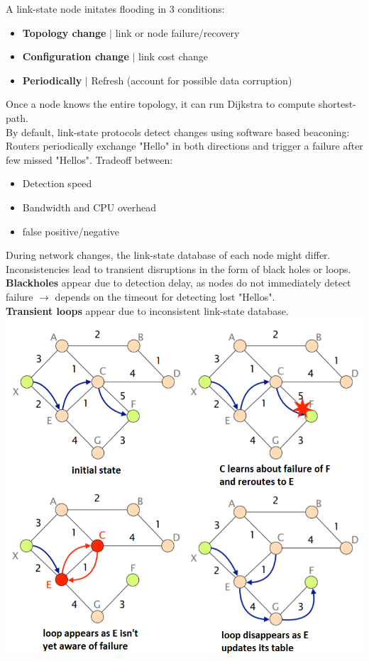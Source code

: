 \documentclass[a4paper, fontsize=8pt, landscape, DIV=1]{scrartcl}
\begin{document}
\begin{multicols*}{4}
\begin{itemize}[noitemsep]
\begin{itemize}
    		\end{itemize}
   	 	\end{itemize}  
   		A link-state node initates flooding in 3 conditions: 
   		\begin{itemize}[noitemsep]
   			\item \textbf{Topology change} $\vert$ link or node failure/recovery
   			\item \textbf{Configuration change} $\vert$ link cost change
   			\item \textbf{Periodically} $\vert$ Refresh (account for possible data corruption)
   		\end{itemize}
   		Once a node knows the entire topology, it can run Dijkstra to compute shortest-path.\\
   		By default, link-state protocols detect changes using software based beaconing:\\
   		Routers periodically exchange "Hello" in both directions and trigger a failure after few missed "Hellos". Tradeoff between: 
   		\begin{itemize}[noitemsep]
   			\item Detection speed
   			\item Bandwidth and CPU overhead
   			\item false positive/negative
   		\end{itemize}  
   		During network changes, the link-state database of each node might differ. Inconsistencies lead to transient disruptions in the form of black holes or loops.\\
   		\textbf{Blackholes} appear due to detection delay, as nodes do not immediately detect failure $\rightarrow$ depends on the timeout for detecting lost "Hellos".\\
   		\textbf{Transient loops} appear due to inconsistent link-state database.
   		\includegraphics[width=\columnwidth]{images/Network_Layer/transient_loop.png} 

\end{multicols*}
\end{document}
